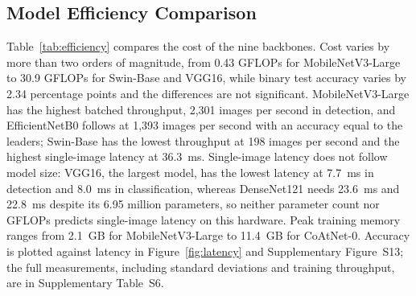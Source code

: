\documentclass[final,3p,times,number]{elsarticle}
\begin{document}
\subsection{Model Efficiency Comparison}
\label{sec:efficiency}

Table~\ref{tab:efficiency} compares the cost of the nine backbones. Cost varies by more than two orders of magnitude, from 0.43 GFLOPs for MobileNetV3-Large to 30.9 GFLOPs for Swin-Base and VGG16, while binary test accuracy varies by 2.34 percentage points and the differences are not significant. MobileNetV3-Large has the highest batched throughput, 2,301 images per second in detection, and EfficientNetB0 follows at 1,393 images per second with an accuracy equal to the leaders; Swin-Base has the lowest throughput at 198 images per second and the highest single-image latency at 36.3~ms. Single-image latency does not follow model size: VGG16, the largest model, has the lowest latency at 7.7~ms in detection and 8.0~ms in classification, whereas DenseNet121 needs 23.6~ms and 22.8~ms despite its 6.95 million parameters, so neither parameter count nor GFLOPs predicts single-image latency on this hardware. Peak training memory ranges from 2.1~GB for MobileNetV3-Large to 11.4~GB for CoAtNet-0. Accuracy is plotted against latency in Figure~\ref{fig:latency} and Supplementary Figure~S13; the full measurements, including standard deviations and training throughput, are in Supplementary Table~S6.
\end{document}
